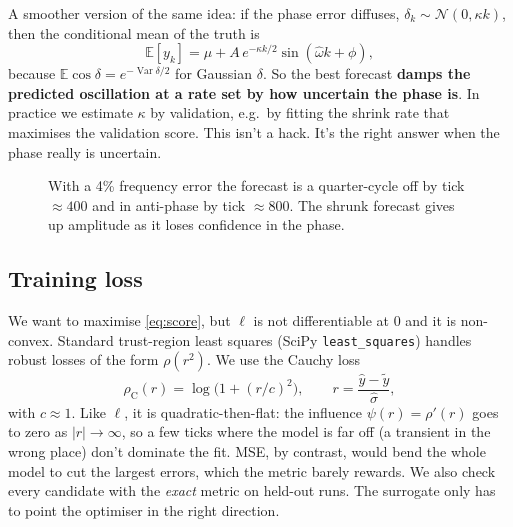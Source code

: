 \documentclass[11pt]{article}
\theoremstyle{plain}
\theoremstyle{definition}
\theoremstyle{remark}
\newcommand{\E}{\mathbb{E}}
\newcommand{\abs}[1]{\left\lvert #1 \right\rvert}
\begin{document}
A smoother version of the same idea: if the phase error diffuses, $\delta_k\sim\mathcal N(0,\kappa k)$, then the conditional mean of the truth is
\begin{equation}\label{eq:shrink}
\E[y_k]=\mu+A\,e^{-\kappa k/2}\sin(\hat\omega k+\phi),
\end{equation}
because $\E\cos\delta=e^{-\operatorname{Var}\delta/2}$ for Gaussian $\delta$. So the best forecast \textbf{damps the predicted oscillation at a rate set by how uncertain the phase is}. In practice we estimate $\kappa$ by validation, e.g.\ by fitting the shrink rate that maximises the validation score. This isn't a hack. It's the right answer when the phase really is uncertain.

\begin{figure}[h]
\centering
{}
\caption{With a 4\% frequency error the forecast is a quarter-cycle off by tick $\approx400$ and in anti-phase by tick $\approx800$. The shrunk forecast gives up amplitude as it loses confidence in the phase.}
\end{figure}

\subsection{Training loss}
We want to maximise \eqref{eq:score}, but $\ell$ is not differentiable at 0 and it is non-convex. Standard trust-region least squares (SciPy \texttt{least\_squares}) handles robust losses of the form $\rho(r^2)$. We use the Cauchy loss
\begin{equation}
\rho_{\text{C}}(r)=\log\!\big(1+(r/c)^2\big),\qquad r=\frac{\hat y-\tilde y}{\hat\sigma},
\end{equation}
with $c\approx1$. Like $\ell$, it is quadratic-then-flat: the influence $\psi(r)=\rho'(r)$ goes to zero as $\abs r\to\infty$, so a few ticks where the model is far off (a transient in the wrong place) don't dominate the fit. MSE, by contrast, would bend the whole model to cut the largest errors, which the metric barely rewards. We also check every candidate with the \emph{exact} metric on held-out runs. The surrogate only has to point the optimiser in the right direction.
\end{document}
